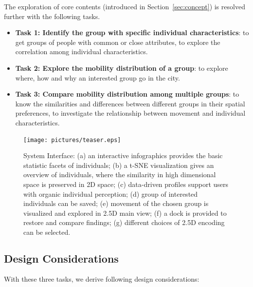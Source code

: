 \documentclass{ieeeaccess}
\begin{document}
The exploration of core contents (introduced in Section~\ref{sec:concept}) is resolved further with the following tasks.

\begin{itemize}
\item \textbf{Task 1: Identify the group with specific individual characteristics}: to get groups of people with common or close attributes, to explore the correlation among individual characteristics.
\item \textbf{Task 2: Explore the mobility distribution of a group}: to explore where, how and why an interested group go in the city.
\item \textbf{Task 3: Compare mobility distribution among multiple groups}: to know the similarities and differences between different groups in their spatial preferences, to investigate the relationship between movement and individual characteristics.
\end{itemize}

\begin{figure}[htb!]
 \centering %
 \texttt{[image: pictures/teaser.eps]}
 \caption{System Interface: (a) an interactive infographics provides the basic statistic facets of individuals; (b) a t-SNE visualization gives an overview of individuals, where the similarity in high dimensional space is preserved in 2D space; (c) data-driven profiles support users with organic individual perception; (d) group of interested individuals can be saved; (e) movement of the chosen group is visualized and explored in 2.5D main view; (f) a dock is provided to restore and compare findings; (g) different choices of 2.5D encoding can be selected.}
 \label{fig:teaser}
\end{figure}

\subsection{Design Considerations}

With these three tasks, we derive following design considerations:
\end{document}
